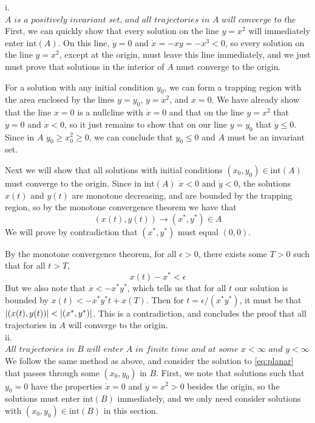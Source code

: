 \documentclass[11pt]{article}
\begin{document}
i. $\textit{A is a positively invariant set, and all trajectories in A will converge to the origin.}$\\

First, we can quickly show that every solution on the line $y = x^2$ will immediately enter $\text{int}(A)$. On this line, $\dot{y} = 0$ and $\dot{x} = -xy = -x^3 < 0$, so every solution on the line $y = x^2$, except at the origin, must leave this line immediately, and we just must prove that solutions in the interior of $A$ must converge to the origin.

For a solution with any initial condition $y_0$, we can form a trapping region with the area enclosed by the lines $y = y_0$, $y = x^2$, and $x = 0$. We have already show that the line $x = 0$ is a nullcline with $\dot{x} = 0$ and that on the line $y = x^2$ that $\dot{y} = 0$ and $\dot{x} < 0$, so it just remains to show that on our line $y = y_0$ that $\dot{y} \leq 0$. Since in $A$ $y_0 \geq x_0^2 \geq 0$, we can conclude that $y_0 \leq 0$ and $A$ must be an invariant set. 

Next we will show that all solutions with initial conditions $(x_0, y_0) \in \text{int}(A)$ must converge to the origin. Since in $\text{int}(A)$ $\dot{x} < 0$ and $\dot{y} < 0$, the solutions $x(t)$ and $y(t)$ are monotone decreasing, and are bounded by the trapping region, so by the monotone convergence theorem we have that $$(x(t), y(t)) \rightarrow (x^*, y^*) \in A$$ We will prove by contradiction that $(x^*, y^*)$ must equal $(0, 0)$. 

By the monotone convergence theorem, for all $\epsilon > 0$, there exists some $T > 0$ such that for all $t > T$, $$x(t) - x^* < \epsilon$$
But we also note that $\dot{x} < -x^*y^*$, which tells us that for all $t$ our solution is bounded by $x(t) < -x^*y^*t + x(T)$. Then for $t = \epsilon/(x^*y^*)$, it must be that $\abs{(x(t), y(t))} < \abs{(x^*, y^*)}$. This is a contradiction, and concludes the proof that all trajectories in $A$ will converge to the origin. \\

ii. $\textit{All trajectories in $B$ will enter $A$ in finite time and at some $x < \infty$ and $y < \infty$}$ \\

We follow the same method as above, and consider the solution to \eqref{eq:planar} that passes through some $(x_0, y_0)$ in $B$. First, we note that solutions such that $y_0 = 0$ have the properties $\dot{x} = 0$ and $\dot{y} = x^2 > 0$ besides the origin, so the solutions must enter $\text{int}(B)$ immediately, and we only need consider solutions with $(x_0, y_0) \in \text{int}(B)$ in this section. 
\end{document}
